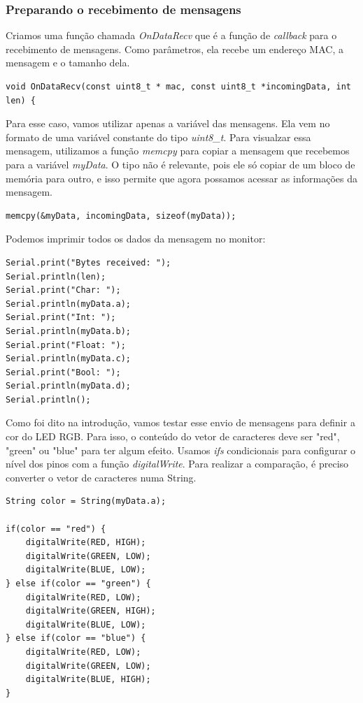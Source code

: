 \documentclass[12pt]{article}
\begin{document}
\subsubsection{Preparando o recebimento de mensagens}

Criamos uma função chamada \textit{OnDataRecv} que é a função de \textit{callback} para o recebimento de mensagens. Como parâmetros, ela recebe um endereço MAC, a mensagem e o tamanho dela. 

\begin{lstlisting}
void OnDataRecv(const uint8_t * mac, const uint8_t *incomingData, int len) {
\end{lstlisting}

Para esse caso, vamos utilizar apenas a variável das mensagens. Ela vem no formato de uma variável constante do tipo \textit{uint8\_t}. Para visualzar essa mensagem, utilizamos a função \textit{memcpy} para copiar a mensagem que recebemos para a variável \textit{myData}. O tipo não é relevante, pois ele só copiar de um bloco de memória para outro, e isso permite que agora possamos acessar as informações da mensagem.

\begin{lstlisting}
memcpy(&myData, incomingData, sizeof(myData));
\end{lstlisting}

Podemos imprimir todos os dados da mensagem no monitor:

\begin{lstlisting}
Serial.print("Bytes received: ");
Serial.println(len);
Serial.print("Char: ");
Serial.println(myData.a);
Serial.print("Int: ");
Serial.println(myData.b);
Serial.print("Float: ");
Serial.println(myData.c);
Serial.print("Bool: ");
Serial.println(myData.d);
Serial.println();
\end{lstlisting}


Como foi dito na introdução, vamos testar esse envio de mensagens para definir a cor do LED RGB. Para isso, o conteúdo do vetor de caracteres deve ser "red", "green" ou "blue" para ter algum efeito. Usamos \textit{ifs} condicionais para configurar o nível dos pinos com a função \textit{digitalWrite}. Para realizar a comparação, é preciso converter o vetor de caracteres numa String.

\begin{lstlisting}
String color = String(myData.a);

if(color == "red") {
    digitalWrite(RED, HIGH);
    digitalWrite(GREEN, LOW);
    digitalWrite(BLUE, LOW);
} else if(color == "green") {
    digitalWrite(RED, LOW);
    digitalWrite(GREEN, HIGH);
    digitalWrite(BLUE, LOW);
} else if(color == "blue") {
    digitalWrite(RED, LOW);
    digitalWrite(GREEN, LOW);
    digitalWrite(BLUE, HIGH);
}
\end{lstlisting}
\end{document}

